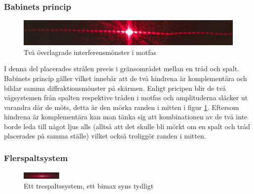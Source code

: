 \documentclass[a4paper]{article}
\begin{document}
\subsubsection{Babinets princip}
\begin{figure}[h!]
	\centering
	\includegraphics[width=\textwidth]{babinet.jpg}
	\caption{Två överlagrade interferensmönster i motfas}
	\label{fig:babinet}
\end{figure}
I denna del placerades strålen precis i gränsområdet mellan en tråd och spalt. Babinets princip gäller vilket innebär att
de två hindrena är komplementära och bildar samma diffraktionsmönster på skärmen. Enligt pricipen blir de två vågsystemen från
spalten respektive tråden i motfas och amplituderna släcker ut varandra där de möts, detta är den mörka randen i mitten i figur \ref{fig:babinet}. 
Eftersom hindrena är komplementära kan man tänka
sig att kombinationen av de två inte borde leda till något ljus alls (alltså att det skulle bli mörkt om en spalt och tråd placerades på samma ställe)
vilket också troliggör randen i mitten.
\subsubsection{Flerspaltsystem}
\begin{figure}[h!]
	\centering
	\includegraphics[width=0.17\textwidth, angle=90]{3spalt.jpg}
	\caption{Ett trespaltssystem, ett bimax syns tydligt}
	\label{fig:3spalt}
\end{figure}
\end{document}
